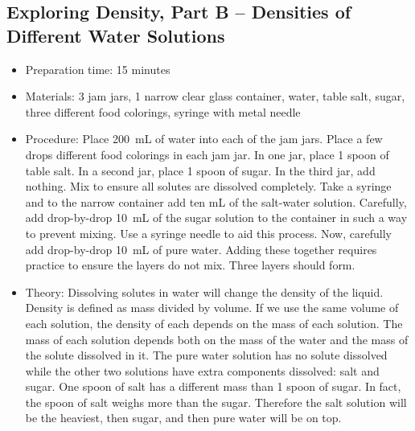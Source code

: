 \subsection{Exploring Density, Part B -- Densities of Different Water Solutions}
\begin{itemize}
\item{Preparation time: 15 minutes}
\item{Materials: 3 jam jars, 1 narrow clear glass container, water, table salt, sugar, three different food colorings, syringe with metal needle}
\item{Procedure: Place 200~mL of water into each of the jam jars. Place a few drops different food colorings in each jam jar. In one jar, place 1 spoon of table salt. In a second jar, place 1 spoon of sugar. In the third jar, add nothing. Mix to ensure all solutes are dissolved completely. Take a syringe and to the narrow container add ten mL of the salt-water solution. Carefully, add drop-by-drop 10~mL of the sugar solution to the container in such a way to prevent mixing. Use a syringe needle to aid this process. Now, carefully add drop-by-drop 10~mL of pure water. Adding these together requires practice to ensure the layers do not mix. Three layers should form.}
\item{Theory: Dissolving solutes in water will change the density of the liquid. Density is defined as mass divided by volume. If we use the same volume of each solution, the density of each depends on the mass of each solution. The mass of each solution depends both on the mass of the water and the mass of the solute dissolved in it. The pure water solution has no solute dissolved while the other two solutions have extra components dissolved: salt and sugar. One spoon of salt has a different mass than 1 spoon of sugar. In fact, the spoon of salt weighs more than the sugar. Therefore the salt solution will be the heaviest, then sugar, and then pure water will be on top.}
\end{itemize}

